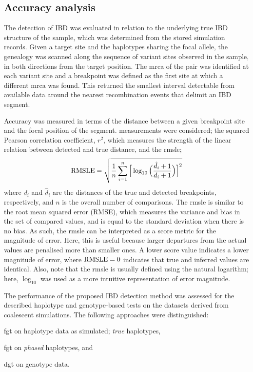 %
\subsection{Accuracy analysis}
\label{sec:ibd_analysis}
%

The detection of IBD was evaluated in relation to the underlying true IBD structure of the sample, which was determined from the stored simulation records.
Given a target site and the  haplotypes sharing the focal allele, the genealogy was scanned along the sequence of variant sites observed in the sample, in both directions from the target position.
The \gls{mrca} of the pair was identified at each variant site and a breakpoint was defined as the first site at which a different \gls{mrca} was found.
This returned the smallest interval detectable from available data around the nearest recombination events that delimit an IBD segment.

Accuracy was measured in terms of the distance between a given breakpoint site and the focal position of the segment.
 measurements were considered; the squared Pearson correlation coefficient, $r^2$, which measures the strength of the linear relation between detected and true distance, and the \gls{rmsle};
\begin{equation}\label{eq:rmsle}
	\operatorname*{RMSLE} = \sqrt{ \frac{1}{n} \sum_{i=1}^n \Big[\log_{10}\Big(\frac{\hat{d}_i + 1}{d_i + 1}\Big)\Big]^2 }
\end{equation}
where $d_i$ and $\hat{d}_i$ are the distances of the true and detected breakpoints, respectively, and $n$ is the overall number of comparisons.
The \gls{rmsle} is similar to the root mean squared error (RMSE), which measures the variance and bias in the set of compared values, and is equal to the standard deviation when there is no bias.
As such, the \gls{rmsle} can be interpreted as a score metric for the magnitude of error.
Here, this is useful because larger departures from the actual values are penalised more than smaller ones.
A lower score value indicates a lower magnitude of error, where ${\operatorname*{RMSLE} = 0}$ indicates that true and inferred values are identical.
Also, note that the \gls{rmsle} is usually defined using the natural logarithm; here, $\log_{10}$ was used as a more intuitive representation of error magnitude.



The performance of the proposed IBD detection method was assessed for the described haplotype and genotype-based tests on the  datasets derived from coalescent simulations.
The following approaches were distinguished:
\begin{approach}\setlength\itemsep{0em}
\item\label{app:fgt_h} \gls{fgt} on haplotype data as simulated; \ie \emph{true} haplotypes,
\item\label{app:fgt_p} \gls{fgt} on \emph{phased} haplotypes, and
\item\label{app:dgt} \gls{dgt} on genotype data.
\end{approach}


